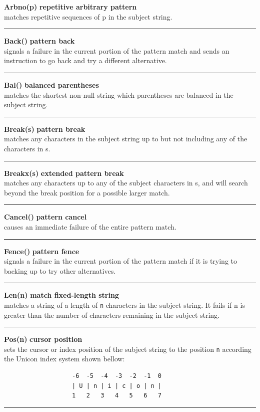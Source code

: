 \documentclass{article}
\begin{document}
\noindent\textbf{Arbno(p)} \hfill\textbf{repetitive arbitrary pattern}\\
matches repetitive sequences of p in the subject string.\\
\noindent\rule{15cm}{0.1pt}

\noindent\textbf{Back()} \hfill\textbf{pattern back}\\
signals a failure in the current portion of the pattern match and sends an instruction to go back and try a different alternative.\\
\noindent\rule{15cm}{0.1pt}

\noindent\textbf{Bal()} \hfill\textbf{balanced parentheses}\\
matches the shortest non-null string which parentheses are balanced in the subject string.\\
\noindent\rule{15cm}{0.1pt}

\noindent\textbf{Break(s)} \hfill\textbf{pattern break}\\
matches any characters in the subject string up to but not including any of the characters in s.\\
\noindent\rule{15cm}{0.1pt}

\noindent\textbf{Breakx(s)} \hfill\textbf{extended pattern break}\\
matches any characters up to any of the subject characters in s, and will search beyond the break position for a possible larger match.\\
\noindent\rule{15cm}{0.1pt}

\noindent\textbf{Cancel()} \hfill\textbf{pattern cancel}\\
causes an immediate failure of the entire pattern match.\\
\noindent\rule{15cm}{0.1pt}

\noindent\textbf{Fence()} \hfill\textbf{pattern fence}\\
signals a failure in the current portion of the pattern match if it is trying to backing up to try other alternatives.\\
\noindent\rule{15cm}{0.1pt}

\noindent\textbf{Len(n)} \hfill\textbf{match fixed-length string}\\
matches a string of a length of \texttt{n} characters in the subject string.  It fails if n is greater than the number of characters remaining in the subject string.\\
\noindent\rule{15cm}{0.1pt}

\noindent\textbf{Pos(n)} \hfill\textbf{cursor position}\\
sets the cursor or index position of the subject string to the position \texttt{n} according the Unicon index system shown bellow:
\begin{verbatim}
                   -6  -5  -4  -3  -2  -1  0
                   | U | n | i | c | o | n |
                   1   2   3   4   5   6   7
\end{verbatim}
\noindent\rule{15cm}{0.1pt}
\end{document}
